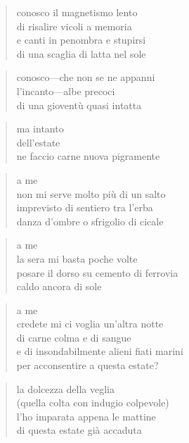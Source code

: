 \begin{verse}
    conosco il magnetismo lento\\
    di risalire vicoli a memoria\\
    e canti in penombra e stupirsi\\
    di una scaglia di latta nel sole
\end{verse}

\begin{verse}
    conosco—che non se ne appanni\\
    l’incanto—albe precoci\\
    di una gioventù quasi intatta
\end{verse}

\begin{verse}
    ma intanto\\
    dell’estate\\
    ne faccio carne nuova
    pigramente
\end{verse}

\clearpage


\begin{verse}
    a me\\
    non mi serve molto più di un salto\\
    imprevisto di sentiero tra l'erba\\
    danza d'ombre o sfrigolio di cicale
\end{verse}

\begin{verse}
    a me\\
    la sera mi basta poche volte\\
    posare il dorso su cemento di ferrovia\\
    caldo ancora di sole
\end{verse}

\begin{verse}
    a me\\
    credete mi ci voglia un'altra notte\\
    di carne colma e di sangue\\
    e di insondabilmente alieni fiati marini\\
    per acconsentire a questa estate?
\end{verse}

\clearpage


\begin{verse}
    la dolcezza della veglia\\
    (quella colta con indugio colpevole)\\
    l'ho imparata appena le mattine\\
    di questa estate già accaduta
\end{verse}

